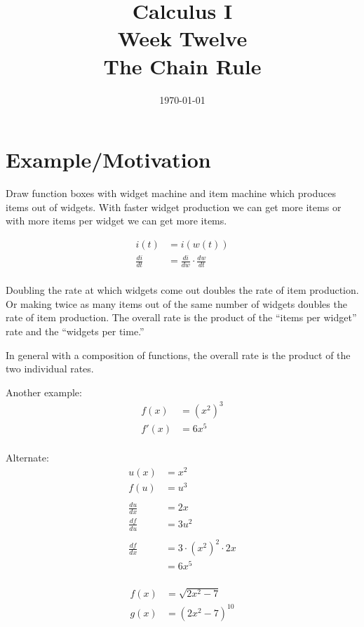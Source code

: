 \documentclass[letterpaper, landscape]{exam}
\author{}
\date{\today}
\title{Calculus I \\ Week Twelve \\ The Chain Rule}
\begin{document}
  \maketitle
  \tableofcontents

  \newpage 

  \section{Example/Motivation} %

  Draw function boxes with widget machine and item machine which produces items out of widgets. With
  faster widget production we can get more items or with more items per widget we can get more
  items.
  
  \begin{align*}
    i(t)          & = i(w(t)) \\
    \frac{di}{dt} & = \frac{di}{dw} \cdot \frac{dw}{dt} \\
  \end{align*}

  Doubling the rate at which widgets come out doubles the rate of item production. Or making twice as
  many items out of the same number of widgets doubles the rate of item production. The overall rate
  is the product of the ``items per widget'' rate and the ``widgets per time.''
  
  In general with a composition of functions, the overall rate is the product of the two individual
  rates.

  Another example:
  \begin{align*}
    f(x)  & = \left( x^2 \right)^3 \\
    f'(x) & = 6x^5 \\
  \end{align*}

  Alternate:
  \begin{align*}
    u(x)          & = x^2 \\
    f(u)          & = u^3 \\
    \\
    \frac{du}{dx} & = 2x \\
    \frac{df}{du} & = 3u^2 \\
    \\
    \frac{df}{dx} & = 3 \cdot \left( x^2 \right)^2 \cdot 2x \\
                  & = 6x^5 \\
  \end{align*}


  \begin{align*}
    f(x) & = \sqrt{2x^2 - 7} \\
    g(x) & = \left( 2x^2 - 7 \right)^{10} \\
  \end{align*}
\end{document}
